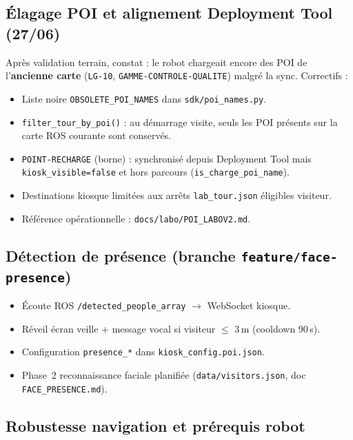 \documentclass[11pt,a4paper]{article}
\begin{document}
\subsection{Élagage POI et alignement Deployment Tool (27/06)}

Après validation terrain, constat : le robot chargeait encore des POI de l'\textbf{ancienne carte} (\texttt{LG-10}, \texttt{GAMME-CONTROLE-QUALITE}) malgré la sync. Correctifs :

\begin{itemize}[noitemsep]
  \item Liste noire \texttt{OBSOLETE\_POI\_NAMES} dans \texttt{sdk/poi\_names.py}.
  \item \texttt{filter\_tour\_by\_poi()} : au démarrage visite, seuls les POI présents sur la carte ROS courante sont conservés.
  \item \texttt{POINT-RECHARGE} (borne) : synchronisé depuis Deployment Tool mais \texttt{kiosk\_visible=false} et hors parcours (\texttt{is\_charge\_poi\_name}).
  \item Destinations kiosque limitées aux arrêts \texttt{lab\_tour.json} éligibles visiteur.
  \item Référence opérationnelle : \texttt{docs/labo/POI\_LABOV2.md}.
\end{itemize}

\subsection{Détection de présence (branche \texttt{feature/face-presence})}

\begin{itemize}[noitemsep]
  \item Écoute ROS \texttt{/detected\_people\_array} $\rightarrow$ WebSocket kiosque.
  \item Réveil écran veille + message vocal si visiteur $\leq$ 3\,m (cooldown 90\,s).
  \item Configuration \texttt{presence\_*} dans \texttt{kiosk\_config.poi.json}.
  \item Phase~2 reconnaissance faciale planifiée (\texttt{data/visitors.json}, doc \texttt{FACE\_PRESENCE.md}).
\end{itemize}

\subsection{Robustesse navigation et prérequis robot}
\end{document}
